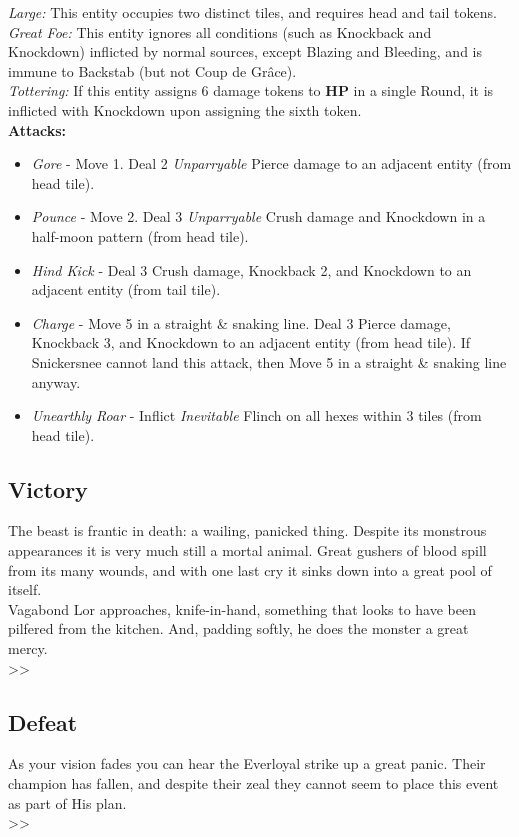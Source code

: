 \emph{Large:} This entity occupies two distinct tiles, and requires head and tail tokens.\\

\emph{Great Foe:} This entity ignores all conditions (such as Knockback and Knockdown) inflicted by normal sources, except Blazing and Bleeding, and is immune to Backstab (but not Coup de Grâce).\\

\emph{Tottering:} If this entity assigns 6 damage tokens to \textbf{HP} in a single Round, it is inflicted with Knockdown upon assigning the sixth token.\\

\textbf{Attacks:}
\begin{itemize}
\item \emph{Gore} -  Move 1. Deal 2 \emph{Unparryable} Pierce damage to an adjacent entity (from head tile).
\item \emph{Pounce} - Move 2. Deal 3 \emph{Unparryable} Crush damage and Knockdown in a half-moon pattern (from head tile).
\item \emph{Hind Kick} - Deal 3 Crush damage, Knockback 2, and Knockdown to an adjacent entity (from tail tile).
\item \emph{Charge} - Move 5 in a straight \& snaking line. Deal 3 Pierce damage, Knockback 3, and Knockdown to an adjacent entity (from head tile). If Snickersnee cannot land this attack, then Move 5 in a straight \& snaking line anyway.
\item \emph{Unearthly Roar} - Inflict \emph{Inevitable} Flinch on all hexes within 3 tiles (from head tile).
\end{itemize}

\pagebreak

\subsection*{Victory}
The beast is frantic in death: a wailing, panicked thing. Despite its monstrous appearances it is very much still a mortal animal. Great gushers of blood spill from its many wounds, and with one last cry it sinks down into a great pool of itself.\\

Vagabond Lor approaches, knife-in-hand, something that looks to have been pilfered from the kitchen. And, padding softly, he does the monster a great mercy.\\

>> 

\subsection*{Defeat}
As your vision fades you can hear the Everloyal strike up a great panic. Their champion has fallen, and despite their zeal they cannot seem to place this event as part of His plan.\\
>> 